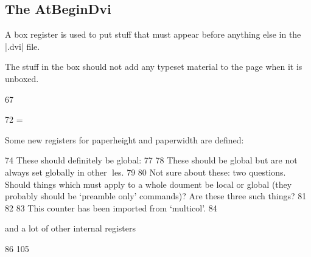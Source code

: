 \subsection*{The AtBeginDvi}
A box register is used  to put stuff that must appear before anything else
in the |.dvi| file.

The stuff in the box should not add any typeset material to the page when it
is unboxed.


\begin{teXXX}
67 \newbox{} \def \AtBeginDvi #1{%
69 \global \setbox \@begindvibox
70 \vbox{\unvbox \@begindvibox #1}%
71 }
\end{teXXX}

\begin{teXXX}
72 \newdimen{} \@maxdepth = \maxdepth
\end{teXXX}


Some new registers for paperheight and paperwidth are defined:

\begin{teXXX}
74 \newdimen{} \newdimen{} \newif \if@insert
These should definitely be global:
77 \newif \if@fcolmade
78 \newif \if@specialpage \@specialpagefalse
These should be global but are not always set globally in other les.
79 \newif \if@firstcolumn \@firstcolumntrue
80 \newif \if@twocolumn \@twocolumnfalse
Not sure about these: two questions. Should things which must apply to a whole
doument be local or global (they probably should be `preamble only' commands)?
Are these three such things?
81 \newif \if@twoside \@twosidefalse
82 \newif \if@reversemargin \@reversemarginfalse
83 \newif \if@mparswitch \@mparswitchfalse
This counter has been imported from `multicol'.
84 \newcount {} \col@number \@ne
\end{teXXX}

and a lot of other internal registers

\begin{teX}
86 \newcount{} \newdimen{} \newcount{} \newdimen{} \newcount{} \newdimen{} \newcount{} \newdimen{} \newdimen{} \newdimen{} \newdimen{} \newdimen{} \newdimen{} \newdimen\@mparbottom \@mparbottom{} \newcount{} \newbox{} \newbox{} \newbox{} \def\@thehead{\@oddhead} %
105 \def\@thefoot{\@oddfoot}
\end{teX}


